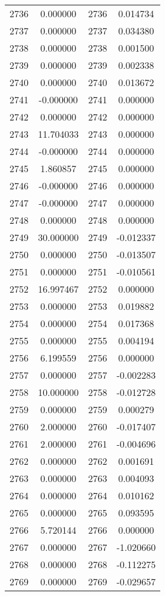 \documentclass[12pt]{article}
\begin{document}
\begin{longtable}{@{}cccc@{}}
2736 & 0.000000 & 2736 & 0.014734 \\
2737 & 0.000000 & 2737 & 0.034380 \\
2738 & 0.000000 & 2738 & 0.001500 \\
2739 & 0.000000 & 2739 & 0.002338 \\
2740 & 0.000000 & 2740 & 0.013672 \\
2741 & -0.000000 & 2741 & 0.000000 \\
2742 & 0.000000 & 2742 & 0.000000 \\
2743 & 11.704033 & 2743 & 0.000000 \\
2744 & -0.000000 & 2744 & 0.000000 \\
2745 & 1.860857 & 2745 & 0.000000 \\
2746 & -0.000000 & 2746 & 0.000000 \\
2747 & -0.000000 & 2747 & 0.000000 \\
2748 & 0.000000 & 2748 & 0.000000 \\
2749 & 30.000000 & 2749 & -0.012337 \\
2750 & 0.000000 & 2750 & -0.013507 \\
2751 & 0.000000 & 2751 & -0.010561 \\
2752 & 16.997467 & 2752 & 0.000000 \\
2753 & 0.000000 & 2753 & 0.019882 \\
2754 & 0.000000 & 2754 & 0.017368 \\
2755 & 0.000000 & 2755 & 0.004194 \\
2756 & 6.199559 & 2756 & 0.000000 \\
2757 & 0.000000 & 2757 & -0.002283 \\
2758 & 10.000000 & 2758 & -0.012728 \\
2759 & 0.000000 & 2759 & 0.000279 \\
2760 & 2.000000 & 2760 & -0.017407 \\
2761 & 2.000000 & 2761 & -0.004696 \\
2762 & 0.000000 & 2762 & 0.001691 \\
2763 & 0.000000 & 2763 & 0.004093 \\
2764 & 0.000000 & 2764 & 0.010162 \\
2765 & 0.000000 & 2765 & 0.093595 \\
2766 & 5.720144 & 2766 & 0.000000 \\
2767 & 0.000000 & 2767 & -1.020660 \\
2768 & 0.000000 & 2768 & -0.112275 \\
2769 & 0.000000 & 2769 & -0.029657 \\

\end{longtable}
\end{document}
